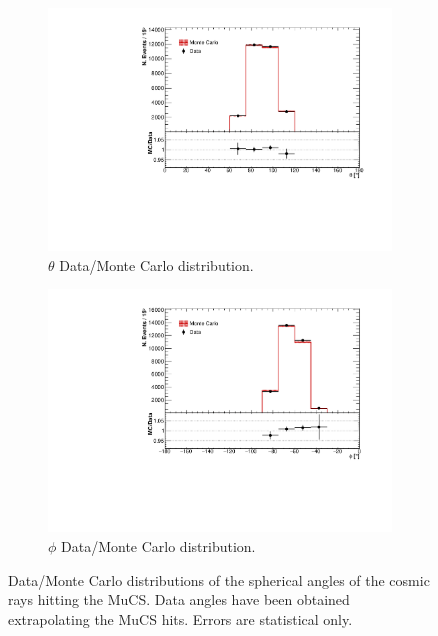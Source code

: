 \documentclass[a4paper]{scrartcl}
\begin{document}
\begin{figure}[htbp]
  \begin{subfigure}{0.52\textwidth}
    \includegraphics[width=\linewidth]{figures/theta_mucs.pdf}
    \caption{$\theta$ Data/Monte Carlo distribution.} \label{fig:theta_mucs}
  \end{subfigure}
  \begin{subfigure}{0.52\textwidth}
    \includegraphics[width=\linewidth]{figures/phi_mucs.pdf}
    \caption{$\phi$ Data/Monte Carlo distribution.} \label{fig:phi_mucs}
  \end{subfigure}
  \caption{Data/Monte Carlo distributions of the spherical angles of the cosmic rays hitting the MuCS. Data angles have been obtained extrapolating the MuCS hits. Errors are statistical only.} \label{fig:mucs_angles}


\end{figure}
\end{document}
